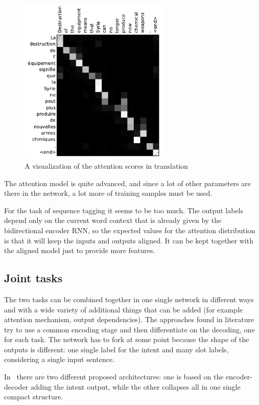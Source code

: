 \begin{figure}[!htbp]
    \centering
    \includegraphics[max width=\linewidth,max height=8cm,keepaspectratio]{figures/attentionVisualization}
    \caption{A visualization of the attention scores in translation~\cite{bahdanau2014neural}}\label{fig:attentionVisualization}
\end{figure}

The attention model is quite advanced, and since a lot of other parameters are there in the network, a lot more of training samples must be used.

For the task of sequence tagging it seems to be too much. The output labels depend only on the current word context that is already given by the bidirectional encoder RNN, so the expected values for the attention distribution is that it will keep the inputs and outputs aligned. It can be kept together with the aligned model just to provide more features.

\subsection{Joint tasks}
The two tasks can be combined together in one single network in different ways and with a wide variety of additional things that can be added (for example attention mechanism, output dependencies). The approaches found in literature try to use a common encoding stage and then differentiate on the decoding, one for each task. The network has to fork at some point because the shape of the outputs is different: one single label for the intent and many slot labels, considering a single input sentence.

In~\cite{liu2016attention} there are two different proposed architectures: one is based on the encoder-decoder adding the intent output, while the other collapses all in one single compact structure.

